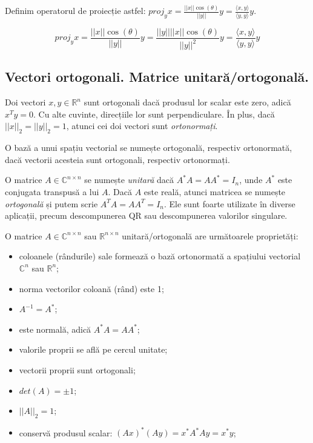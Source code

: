 \documentclass{exam}
\begin{document}
Definim operatorul de proiecție astfel: $proj_y x = \frac{||x|| \cos (\theta)}{||y||} y = \frac{\langle x, y \rangle}{\langle y, y \rangle} y$.

\begin{equation*}
	proj_y x = \frac{||x|| \cos (\theta)}{||y||} y = \frac{||y||||x|| \cos (\theta)}{||y||^2} y = \frac{\langle x, y \rangle}{\langle y, y \rangle} y
\end{equation*}

\subsection{Vectori ortogonali. Matrice unitară/ortogonală.}

\par Doi vectori $x, y \in \mathbb{R}^n$ sunt ortogonali dacă produsul lor
scalar este zero, adică $x^Ty = 0$. Cu alte cuvinte, direcțiile lor sunt
perpendiculare. În plus, dacă $||x||_2 = ||y||_2 = 1$, atunci cei doi
vectori sunt \textit{ortonormați}.

\par O bază a unui spațiu vectorial se numește ortogonală, respectiv ortonormată,
dacă vectorii acesteia sunt ortogonali, respectiv ortonormați.

\par O matrice $A \in \mathbb{C}^{n \times n}$ se numește \textit{unitară} dacă
$A^*A = AA^* = I_n$, unde $A^*$ este conjugata transpusă a lui $A$. Dacă $A$
este reală, atunci matricea se numește \textit{ortogonală} și putem scrie
$A^TA = AA^T = I_n$. Ele sunt foarte utilizate în diverse aplicații, precum
descompunerea QR sau descompunerea valorilor singulare.

\par O matrice $A \in \mathbb{C}^{n \times n}$ sau $\mathbb{R}^{n \times n}$
unitară/ortogonală are următoarele proprietăți:

\begin{itemize}
	\item coloanele (rândurile) sale formează o bază ortonormată a spațiului
	      vectorial $\mathbb{C}^n$ sau $\mathbb{R}^n$;
	\item norma vectorilor coloană (rând) este 1;
	\item $A^{-1} = A^*$;
	\item este normală, adică $A^*A = AA^*$;
	\item valorile proprii se află pe cercul unitate;
	\item vectorii proprii sunt ortogonali;
	\item $det(A) = \pm 1$;
	\item $||A||_2 = 1$;
	\item conservă produsul scalar: $(Ax)^*(Ay) = x^*A^*Ay = x^*y$;
\end{itemize}
\end{document}
